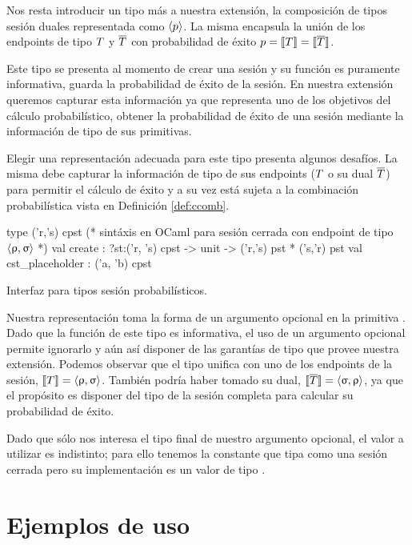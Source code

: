 Nos resta introducir un tipo más a nuestra extensión, la composición de tipos
sesión duales representada como $\langle p \rangle$. La misma encapsula la
unión de los endpoints de tipo $T$ y $\overline{T}$ con probabilidad de éxito $p =
\llbracket T\rrbracket = \llbracket\overline{T}\rrbracket$. 

Este tipo se presenta al momento de crear una sesión y su función es puramente
informativa, guarda la probabilidad de éxito de la sesión. En nuestra extensión
queremos capturar esta información ya que representa uno de los objetivos del
cálculo probabilístico, obtener la probabilidad de éxito de una sesión mediante
la información de tipo de sus primitivas.

Elegir una representación adecuada para este tipo presenta algunos desafíos.
La misma debe capturar la información de tipo de sus endpoints ($T$ o su
dual $\overline{T}$) para permitir el cálculo de éxito y a su vez está sujeta a la
combinación probabilística vista en Definición \ref{def:ccomb}.

\begin{table}[htb]
	\begin{OCamlD}[frame=single]
  type ('r,'s) cpst (* sintáxis en OCaml para sesión cerrada
                     con endpoint de tipo $\langle\uprho,\upsigma\rangle$ *)
  val create  : ?st:('r, 's) cpst -> unit -> ('r,'s) pst * ('s,'r) pst
  val cst_placeholder : ('a, 'b) cpst
	\end{OCamlD}
	\caption{Interfaz \OCaml para tipos sesión probabilísticos.}
	\label{tab:create_cpst_sig}
\end{table}

Nuestra representación toma la forma de un argumento opcional en la primitiva
. Dado que la función de este tipo es informativa, el uso de un
argumento opcional permite ignorarlo y aún así disponer de las garantías de
tipo que provee nuestra extensión. Podemos observar que el tipo unifica con uno
de los endpoints de la sesión, $\llbracket T\rrbracket = \langle\uprho,\upsigma\rangle$. También
podría haber tomado su dual, $\llbracket\overline{T}\rrbracket = \langle\upsigma,\uprho\rangle$, ya que
el propósito es disponer del tipo de la sesión completa para calcular su
probabilidad de éxito.

Dado que sólo nos interesa el tipo final de nuestro argumento opcional, el
valor a utilizar es indistinto; para ello tenemos la constante
 que tipa como una sesión cerrada pero su implementación es
un valor de tipo .

\section{Ejemplos de uso}

